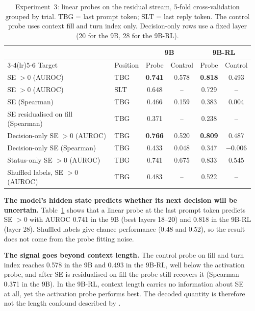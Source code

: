 \documentclass{article}
\begin{document}
\begin{table}[!ht]
  \centering
  \small
  \caption{Experiment~3: linear probes on the residual stream, 5-fold cross-validation grouped by trial.
  TBG = last prompt token; SLT = last reply token.
  The control probe uses context fill and turn index only.
  Decision-only rows use a fixed layer (20 for the 9B, 28 for the 9B-RL).}
  \label{tab:probe}
  \begin{tabular}{@{}llcccc@{}}
    \toprule
    & & \multicolumn{2}{c}{9B} & \multicolumn{2}{c}{9B-RL} \\
    \cmidrule(lr){3-4}\cmidrule(lr){5-6}
    Target & Position & Probe & Control & Probe & Control \\
    \midrule
    SE $>0$ (AUROC) & TBG & \textbf{0.741} & 0.578 & \textbf{0.818} & 0.493 \\
    SE $>0$ (AUROC) & SLT & 0.648 & -- & 0.729 & -- \\
    SE (Spearman) & TBG & 0.466 & 0.159 & 0.383 & 0.004 \\
    SE residualised on fill (Spearman) & TBG & 0.371 & -- & 0.238 & -- \\
    Decision-only SE $>0$ (AUROC) & TBG & \textbf{0.766} & 0.520 & \textbf{0.809} & 0.487 \\
    Decision-only SE (Spearman) & TBG & 0.433 & 0.048 & 0.347 & $-0.006$ \\
    Status-only SE $>0$ (AUROC) & TBG & 0.741 & 0.675 & 0.833 & 0.545 \\
    Shuffled labels, SE $>0$ (AUROC) & TBG & 0.483 & -- & 0.522 & -- \\
    \bottomrule
  \end{tabular}
\end{table}

\textbf{The model's hidden state predicts whether its next decision will be uncertain.} Table~\ref{tab:probe} shows that a linear probe at the last prompt token predicts SE $>0$ with AUROC 0.741 in the 9B (best layers 18--20) and 0.818 in the 9B-RL (layer 28).
Shuffled labels give chance performance (0.48 and 0.52), so the result does not come from the probe fitting noise.

\textbf{The signal goes beyond context length.} The control probe on fill and turn index reaches 0.578 in the 9B and 0.493 in the 9B-RL, well below the activation probe, and after SE is residualised on fill the probe still recovers it (Spearman 0.371 in the 9B).
In the 9B-RL, context length carries no information about SE at all, yet the activation probe performs best.
The decoded quantity is therefore not the length confound described by \citet{du2025context}.
\end{document}
